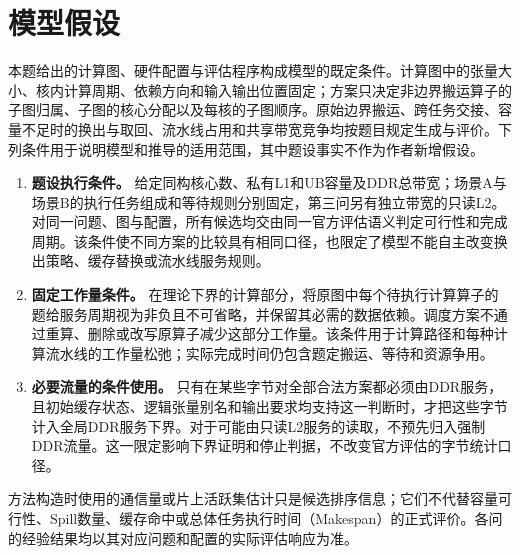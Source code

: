 \section{模型假设}

本题给出的计算图、硬件配置与评估程序构成模型的既定条件。计算图中的张量大小、核内计算周期、依赖方向和输入输出位置固定；方案只决定非边界搬运算子的子图归属、子图的核心分配以及每核的子图顺序。原始边界搬运、跨任务交接、容量不足时的换出与取回、流水线占用和共享带宽竞争均按题目规定生成与评价。下列条件用于说明模型和推导的适用范围，其中题设事实不作为作者新增假设。

\begin{enumerate}
  \item \textbf{题设执行条件。} 给定同构核心数、私有L1和UB容量及DDR总带宽；场景A与场景B的执行任务组成和等待规则分别固定，第三问另有独立带宽的只读L2。对同一问题、图与配置，所有候选均交由同一官方评估语义判定可行性和完成周期。该条件使不同方案的比较具有相同口径，也限定了模型不能自主改变换出策略、缓存替换或流水线服务规则。
  \item \textbf{固定工作量条件。} 在理论下界的计算部分，将原图中每个待执行计算算子的题给服务周期视为非负且不可省略，并保留其必需的数据依赖。调度方案不通过重算、删除或改写原算子减少这部分工作量。该条件用于计算路径和每种计算流水线的工作量松弛；实际完成时间仍包含题定搬运、等待和资源争用。
  \item \textbf{必要流量的条件使用。} 只有在某些字节对全部合法方案都必须由DDR服务，且初始缓存状态、逻辑张量别名和输出要求均支持这一判断时，才把这些字节计入全局DDR服务下界。对于可能由只读L2服务的读取，不预先归入强制DDR流量。这一限定影响下界证明和停止判据，不改变官方评估的字节统计口径。
\end{enumerate}

方法构造时使用的通信量或片上活跃集估计只是候选排序信息；它们不代替容量可行性、Spill数量、缓存命中或总体任务执行时间（Makespan）的正式评价。各问的经验结果均以其对应问题和配置的实际评估响应为准。

